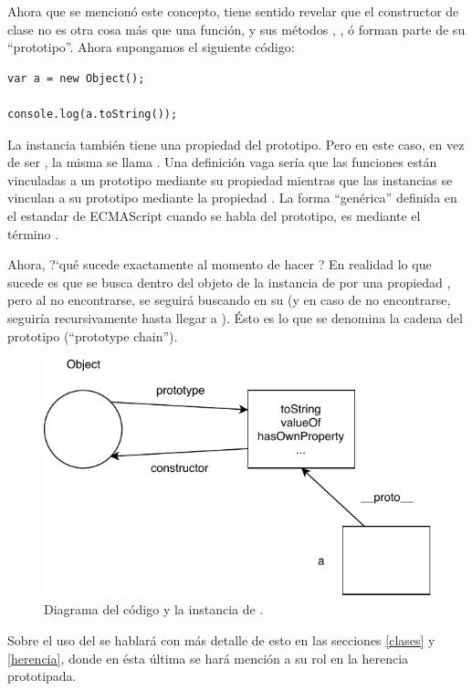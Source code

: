 Ahora que se mencionó este concepto, tiene sentido revelar que el constructor de clase  no es otra cosa más que una función, y sus métodos , , ó  forman parte de su "`prototipo"'. Ahora supongamos el siguiente código:

\begin{lstlisting}
var a = new Object();

console.log(a.toString());
\end{lstlisting}

La instancia  también tiene una propiedad del prototipo. Pero en este caso, en vez de ser , la misma se llama . Una definición vaga sería que las funciones están vinculadas a un prototipo mediante su propiedad  mientras que las instancias se vinculan a su prototipo mediante la propiedad . La forma "`genérica"' definida en el estandar de ECMAScript cuando se habla del prototipo, es mediante el término \code{[[Prototype]]}.

Ahora, ?`qué sucede exactamente al momento de hacer ? En realidad lo que sucede es que se busca dentro del objeto de la instancia de  por una propiedad , pero al no encontrarse, se seguirá buscando en su \code{[[Prototype]]} (y en caso de no encontrarse, seguiría recursivamente hasta llegar a ). Ésto es lo que se denomina la cadena del prototipo ("`prototype chain"').

\begin{figure}[th]
\centering
\includegraphics{Figures/Prototype2}
\decoRule
\caption[]{Diagrama del código y la instancia de .}
\label{fig:prototype2}
\end{figure}

Sobre el uso del  se hablará con más detalle de esto en las secciones \ref{clases} y \ref{herencia}, donde en ésta última se hará mención a su rol en la herencia prototipada.